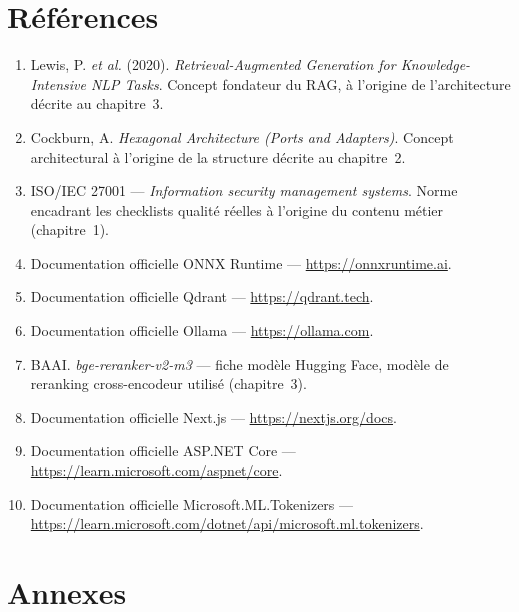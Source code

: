\documentclass[12pt,a4paper]{article}
\begin{document}
\newpage
\section*{R\'ef\'erences}

\begin{enumerate}[leftmargin=1.8em]
\item Lewis, P. \textit{et al.} (2020). \textit{Retrieval-Augmented Generation for Knowledge-Intensive NLP Tasks}. Concept fondateur du RAG, \`a l'origine de l'architecture d\'ecrite au chapitre~3.
\item Cockburn, A. \textit{Hexagonal Architecture (Ports and Adapters)}. Concept architectural \`a l'origine de la structure d\'ecrite au chapitre~2.
\item ISO/IEC 27001 --- \textit{Information security management systems}. Norme encadrant les checklists qualit\'e r\'eelles \`a l'origine du contenu m\'etier (chapitre~1).
\item Documentation officielle ONNX Runtime --- \url{https://onnxruntime.ai}.
\item Documentation officielle Qdrant --- \url{https://qdrant.tech}.
\item Documentation officielle Ollama --- \url{https://ollama.com}.
\item BAAI. \textit{bge-reranker-v2-m3} --- fiche mod\`ele Hugging Face, mod\`ele de reranking cross-encodeur utilis\'e (chapitre~3).
\item Documentation officielle Next.js --- \url{https://nextjs.org/docs}.
\item Documentation officielle ASP.NET Core --- \url{https://learn.microsoft.com/aspnet/core}.
\item Documentation officielle Microsoft.ML.Tokenizers --- \url{https://learn.microsoft.com/dotnet/api/microsoft.ml.tokenizers}.
\end{enumerate}

\newpage
\section*{Annexes}
\end{document}

